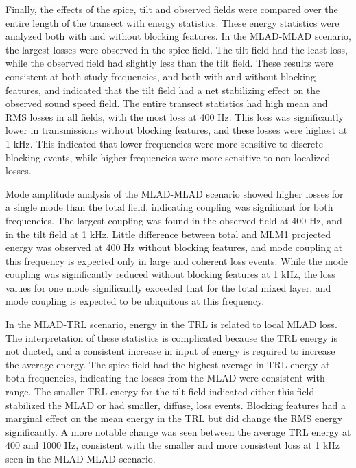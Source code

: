 \documentclass[preprint,NumberedRefs]{JASA}
\begin{document}
Finally, the effects of the spice, tilt and observed fields were compared over the entire length of the transect with energy statistics. These energy statistics were analyzed both with and without blocking features. In the MLAD-MLAD scenario, the largest losses were observed in the spice field. The tilt field had the least loss, while the observed field had slightly less than the tilt field. These results were consistent at both study frequencies, and both with and without blocking features, and indicated that the tilt field had a net stabilizing effect on the observed sound speed field. The entire transect statistics had high mean and RMS losses in all fields, with the most loss at 400 Hz. This loss was significantly lower in transmissions without blocking features, and these losses were highest at 1 kHz. This indicated that lower frequencies were more sensitive to discrete blocking events, while higher frequencies were more sensitive to non-localized losses.

Mode amplitude analysis of the MLAD-MLAD scenario showed higher losses for a single mode than the total field, indicating coupling was significant for both frequencies. The largest coupling was found in the observed field at 400 Hz, and in the tilt field at 1 kHz. Little difference between total and MLM1 projected energy was observed at 400 Hz without blocking features, and mode coupling at this frequency is expected only in large and coherent loss events. While the mode coupling was significantly reduced without blocking features at 1 kHz, the loss values for one mode significantly exceeded that for the total mixed layer, and mode coupling is expected to be ubiquitous at this frequency.

In the MLAD-TRL scenario, energy in the TRL is related to local MLAD loss. The interpretation of these statistics is complicated because the TRL energy is not ducted, and a consistent increase in input of energy is required to increase the average energy. The spice field had the highest average in TRL energy at both frequencies, indicating the losses from the MLAD were consistent with range. The smaller TRL energy for the tilt field indicated either this field stabilized the MLAD or had smaller, diffuse, loss events. Blocking features had a marginal effect on the mean energy in the TRL but did change the RMS energy significantly. A more notable change was seen between the average TRL energy at 400 and 1000 Hz, consistent with the smaller and more consistent loss at 1 kHz seen in the MLAD-MLAD scenario.
\end{document}
